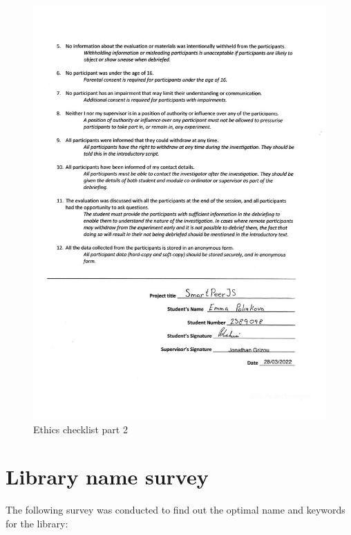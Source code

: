 \documentclass{l4proj}
\begin{document}
\begin{appendices}
\begin{figure}[h!]
    \centering
    \includegraphics[width=13.5cm]{./images/ethics2.jpg}
    \caption{Ethics checklist part 2}
\end{figure}

\pagebreak

\section{Library name survey}
The following survey was conducted to find out the optimal name and keywords for the library: 


\end{appendices}
\end{document}
